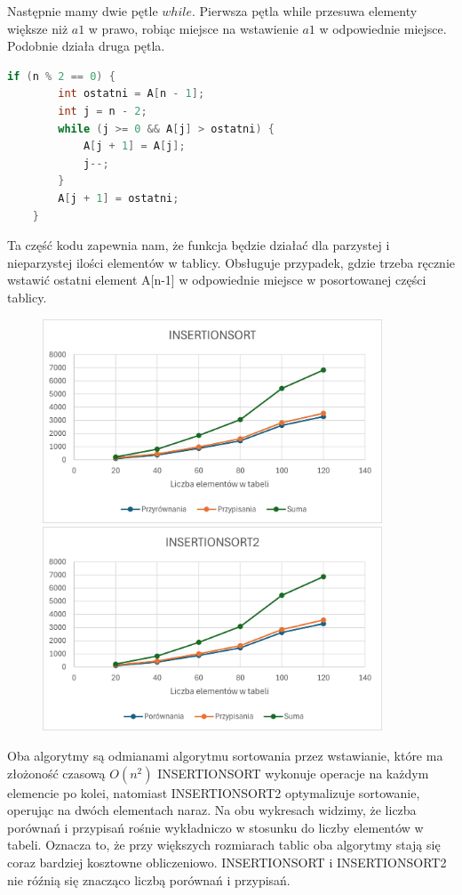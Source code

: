 \documentclass{article}
\begin{document}
	Następnie mamy dwie pętle \(while\). Pierwsza pętla while przesuwa elementy większe niż \(a1\) w prawo, robiąc miejsce na wstawienie \(a1\) w odpowiednie miejsce. Podobnie działa druga pętla.
	\begin{lstlisting}[language=C++, tabsize=3]
	if (n % 2 == 0) {
		int ostatni = A[n - 1];
		int j = n - 2;
		while (j >= 0 && A[j] > ostatni) {
			A[j + 1] = A[j];
			j--;
		}
		A[j + 1] = ostatni;
	}
	\end{lstlisting}
	Ta część kodu zapewnia nam, że funkcja będzie działać dla parzystej i nieparzystej ilości elementów w tablicy. Obsługuje przypadek, gdzie trzeba ręcznie wstawić ostatni element A[n-1] w odpowiednie miejsce w posortowanej części tablicy.
	
	\begin{figure}[H]
		\centering
		\includegraphics[width=0.9\textwidth]{INS1.jpg}
		\includegraphics[width=0.9\textwidth]{INS2.png}
	\end{figure}
	
	Oba algorytmy są odmianami algorytmu sortowania przez wstawianie, które ma złożoność czasową \( O(n^2) \) INSERTIONSORT wykonuje operacje na każdym elemencie po kolei, natomiast INSERTIONSORT2 optymalizuje sortowanie, operując na dwóch elementach naraz. Na obu wykresach widzimy, że liczba porównań i przypisań rośnie wykładniczo w stosunku do liczby elementów w tabeli. Oznacza to, że przy większych rozmiarach tablic oba algorytmy stają się coraz bardziej kosztowne obliczeniowo. INSERTIONSORT i INSERTIONSORT2 nie róźnią się znacząco liczbą porównań i przypisań. 
	
\end{document}
